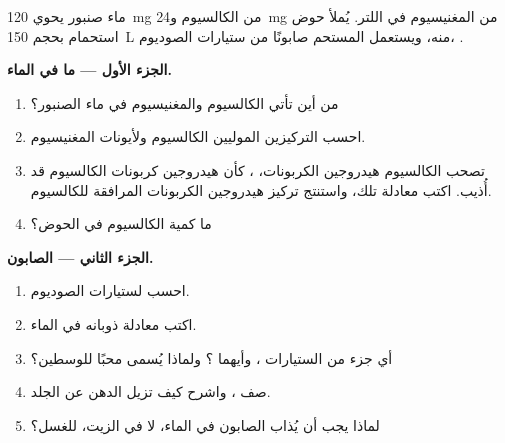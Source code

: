 \begin{problem}
\label{pb:g11:dissolution:1}
ماء صنبور يحوي \qty{120}{mg} من  الكالسيوم و\qty{24}{mg} من
 المغنيسيوم في اللتر. يُملأ حوض استحمام بحجم \qty{150}{L} منه، ويستعمل
المستحم صابونًا من ستيارات الصوديوم، .

\medskip
\noindent\textbf{الجزء الأول --- ما في الماء.}
\begin{enumerate}
  \item من أين تأتي  الكالسيوم والمغنيسيوم في ماء الصنبور؟
  \item احسب التركيزين الموليين  الكالسيوم ولأيونات
        المغنيسيوم.
  \item تصحب  الكالسيوم  هيدروجين الكربونات،
        ، كأن هيدروجين كربونات الكالسيوم  قد
        أُذيب. اكتب معادلة  تلك، واستنتج
        تركيز  هيدروجين الكربونات المرافقة
        للكالسيوم.
  \item ما كمية  الكالسيوم في الحوض؟
\end{enumerate}

\medskip
\noindent\textbf{الجزء الثاني --- الصابون.}
\begin{enumerate}[resume]
  \item احسب  لستيارات الصوديوم.
  \item اكتب معادلة ذوبانه في الماء.
  \item أي جزء من  الستيارات ، وأيهما
        ؟ ولماذا يُسمى محبًا للوسطين؟
  \item صف ، واشرح كيف تزيل الدهن عن
        الجلد.
  \item لماذا يجب أن يُذاب الصابون في الماء، لا في الزيت، للغسل؟
\end{enumerate}


\end{problem}
